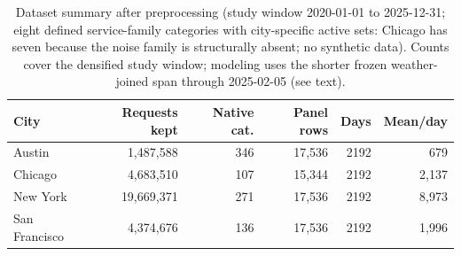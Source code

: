 \begin{table}[t]\centering
\caption{Dataset summary after preprocessing (study window 2020-01-01 to 2025-12-31; eight defined service-family categories with city-specific active sets: Chicago has seven because the noise family is structurally absent; no synthetic data). Counts cover the densified study window; modeling uses the shorter frozen weather-joined span through 2025-02-05 (see text).}
\label{tab:data}
\small\begin{tabular}{lrrrrr}
\toprule
City & Requests kept & Native cat. & Panel rows & Days & Mean/day \\
\midrule
Austin & 1,487,588 & 346 & 17,536 & 2192 & 679 \\
Chicago & 4,683,510 & 107 & 15,344 & 2192 & 2,137 \\
New York & 19,669,371 & 271 & 17,536 & 2192 & 8,973 \\
San Francisco & 4,374,676 & 136 & 17,536 & 2192 & 1,996 \\
\bottomrule
\end{tabular}
\end{table}
